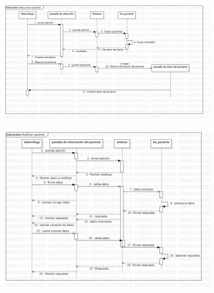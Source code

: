 \documentclass[10pt]{article}
\begin{document}
\begin{figure}[H]
	\begin{center}
\includegraphics[scale = 0.40]{UML/Secuencias/Caso_de_uso_6.jpg} 
	\end{center} 
\end{figure}


\begin{figure}[H]
	\begin{center}
\includegraphics[scale = 0.45]{UML/Secuencias/Caso_de_uso_7.jpg} 
	\end{center} 
\end{figure}
\end{document}
